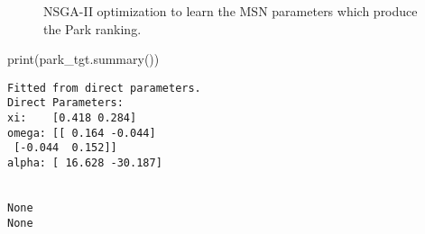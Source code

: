 \documentclass[
  authoryear,
  preprint,
  3p]{elsarticle}
\newenvironment{Shaded}{\begin{snugshade}}{\end{snugshade}}
\newcommand{\BuiltInTok}[1]{\textcolor[rgb]{0.00,0.23,0.31}{#1}}
\newcommand{\NormalTok}[1]{\textcolor[rgb]{0.00,0.23,0.31}{#1}}
\begin{document}
\begin{figure}

\begin{minipage}{0.50\linewidth}



\end{minipage}%
%
\begin{minipage}{0.50\linewidth}



\end{minipage}%

\caption{\label{fig-pymoo-parks}NSGA-II optimization to learn the MSN
parameters which produce the Park ranking.}

\end{figure}%

\begin{Shaded}
\begin{Highlighting}[]
\BuiltInTok{print}\NormalTok{(park\_tgt.summary())}
\end{Highlighting}
\end{Shaded}

\begin{verbatim}
Fitted from direct parameters.
Direct Parameters:
xi:    [0.418 0.284]
omega: [[ 0.164 -0.044]
 [-0.044  0.152]]
alpha: [ 16.628 -30.187]


None
None
\end{verbatim}


  
\end{document}
